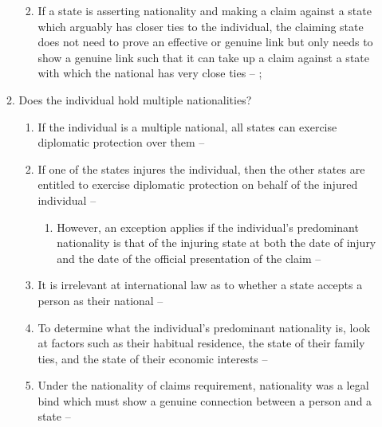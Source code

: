 \begin{enumerate}
\begin{enumerate}
\begin{enumerate}
\begin{enumerate}
            \end{enumerate}
            \item If a state is asserting nationality and making a claim against a state which arguably has closer ties to the individual, the claiming state does not need to prove an effective or genuine link but only needs to show a genuine link such that it can take up a claim against a state with which the national has very close ties -- ; 
        \end{enumerate}
        \item Does the individual hold multiple nationalities?
        \begin{enumerate}
            \item If the individual is a multiple national, all states can exercise diplomatic protection over them -- 
            \item If one of the states injures the individual, then the other states are entitled to exercise diplomatic protection on behalf of the injured individual -- 
            \begin{enumerate}
                \item However, an exception applies if the individual's predominant nationality is that of the injuring state at both the date of injury and the date of the official presentation of the claim -- 
            \end{enumerate}
            \item It is irrelevant at international law as to whether a state accepts a person as their national -- 
            \item To determine what the individual's predominant nationality is, look at factors such as their habitual residence, the state of their family ties, and the state of their economic interests -- 
            \item Under the nationality of claims requirement, nationality was a legal bind which must show a genuine connection between a person and a state -- 

\end{enumerate}
\end{enumerate}
\end{enumerate}
